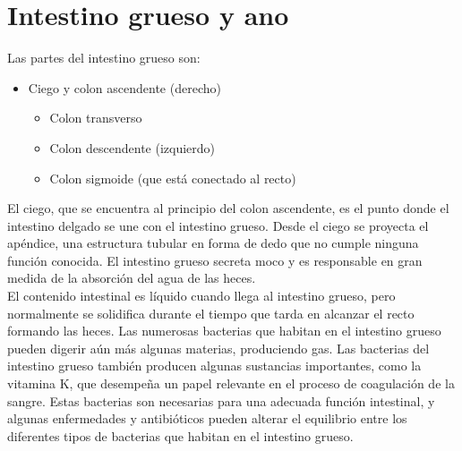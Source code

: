 \section{Intestino grueso y ano}
Las partes del intestino grueso son:\\
\begin{itemize}
    \item Ciego y colon ascendente (derecho)
    \begin{itemize}
        \item Colon transverso
        \item Colon descendente (izquierdo)
        \item Colon sigmoide (que está conectado al recto)
    \end{itemize}
\end{itemize}
El ciego, que se encuentra al principio del colon ascendente, es el punto donde el intestino delgado se une con el intestino grueso. Desde el ciego se proyecta el apéndice, 
una estructura tubular en forma de dedo que no cumple ninguna función conocida. El intestino grueso secreta moco y es responsable en gran medida de la absorción del agua de las heces.\\
El contenido intestinal es líquido cuando llega al intestino grueso, pero normalmente se solidifica durante el tiempo que tarda en alcanzar el recto formando las heces. 
Las numerosas bacterias que habitan en el intestino grueso pueden digerir aún más algunas materias, produciendo gas. Las bacterias del intestino grueso también producen 
algunas sustancias importantes, como la vitamina K, que desempeña un papel relevante en el proceso de coagulación de la sangre. Estas bacterias son necesarias para una 
adecuada función intestinal, y algunas enfermedades y antibióticos pueden alterar el equilibrio entre los diferentes tipos de bacterias que habitan en el intestino grueso.\\
